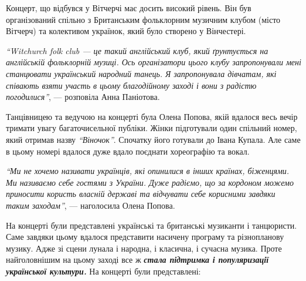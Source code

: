 
Концерт, що відбувся у Вітчерчі має досить високий рівень. Він був
організований спільно з Британським фольклорним музичним клубом (місто Вітчерч)
та колективом українок, який було створено у Вінчестері.

\begin{leftbar}
\emph{\enquote{Witchurch folk club — це такий англійський клуб, який ґрунтується на
англійській фольклорній музиці. Ось організатори цього клубу
запропонували мені станцювати український народний танець. Я
запропонувала дівчатам, які співають взяти участь в цьому благодійному
заході і вони з радістю погодилися}}, — розповіла Анна Паніотова.
\end{leftbar}


Танцівницею та ведучою на концерті була Олена Попова, якій вдалося весь вечір
тримати увагу багаточисельної публіки. Жінки підготували один спільний номер,
який отримав назву \emph{\enquote{Віночок}}. Спочатку його готували до Івана Купала. Але саме
в цьому номері вдалося дуже вдало поєднати хореографію та вокал.

\begin{leftbar}
\emph{\enquote{Ми не хочемо називати українців, які опинилися в інших країнах, біженцями.
Ми називаємо себе гостями з України. Дуже радіємо, що за кордоном
можемо приносити користь власній державі та відчувати себе корисними
завдяки таким заходам}}, — наголосила Олена Попова.
\end{leftbar}


На концерті були представлені українські та британські музиканти і танцюристи.
Саме завдяки цьому вдалося представити насичену програму та різнопланову
музику. Адже зі сцени лунала і народна, і класична, і сучасна музика. Проте
найголовнішим на цьому заході все ж \emph{\textbf{стала підтримка і
популяризації української культури.}} На концерті були представлені:

